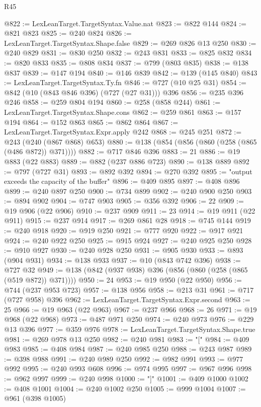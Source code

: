 \begin{lexlean}{R45}
\begin{coremodule}
@822 := LexLeanTarget.TargetSyntax.Value.nat
@823 := @822 @144
@824 := @821 @823
@825 := @240 @824
@826 := LexLeanTarget.TargetSyntax.Shape.false
@829 := @269 @826 @13 @250
@830 := @240 @829
@831 := @830 @250
@832 := @243 @831
@833 := @825 @832
@834 := @820 @833
@835 := @808 @834
@837 := @799 (@803 @835)
@838 := @138 @837
@839 := @147 @194
@840 := @146 @839
@842 := @139 (@145 @840)
@843 := LexLeanTarget.TargetSyntax.Ty.fn
@846 := @727 (@10 @25 @31)
@854 := @842 (@10 (@843 @846 @396) (@727 (@27 @31))) @396
@856 := @235 @396 @246
@858 := @259 @804 @194
@860 := @258 (@858 @244)
@861 := LexLeanTarget.TargetSyntax.Shape.cons
@862 := @259 @861
@863 := @157 @194
@864 := @152 @863
@865 := @862 @864
@867 := LexLeanTarget.TargetSyntax.Expr.apply @242
@868 := @245 @251
@872 := @243 (@240 (@867 @868) @653)
@880 := @138 (@854 (@856 (@860 (@258 (@865 (@486 @872)) @371))))
@882 := @717 @846 @396
@883 := 21
@886 := @19 @883 (@22 @883)
@889 := @882 (@237 @886 @723)
@890 := @138 @889
@892 := @797 (@727 @31)
@893 := @892 @392
@894 := @270 @392
@895 := "output exceeds the capacity of the buffer"
@896 := @409 @895
@897 := @408 @896
@899 := @240 @897 @250
@900 := @734 @899
@902 := @240 @900 @250
@903 := @894 @902
@904 := @747 @903
@905 := @356 @392
@906 := 22
@909 := @19 @906 (@22 @906)
@910 := @237 @909
@911 := 23
@914 := @19 @911 (@22 @911)
@915 := @237 @914
@917 := @269 @861 @28
@918 := @745 @144
@919 := @240 @918
@920 := @919 @250
@921 := @777 @920
@922 := @917 @921
@924 := @240 @922 @250
@925 := @915 @924
@927 := @240 @925 @250
@928 := @910 @927
@930 := @240 @928 @250
@931 := @905 @930
@933 := @893 (@904 @931)
@934 := @138 @933
@937 := @10 (@843 @742 @396)
@938 := @727 @32
@949 := @138 (@842 (@937 @938) @396 (@856 (@860 (@258 (@865 (@519 @872)) @371))))
@950 := 24
@953 := @19 @950 (@22 @950)
@956 := @744 (@237 @953 @723)
@957 := @138 @956
@958 := @213 @31
@961 := @717 (@727 @958) @396
@962 := LexLeanTarget.TargetSyntax.Expr.second
@963 := 25
@966 := @19 @963 (@22 @963)
@967 := @237 @966
@968 := 26
@971 := @19 @968 (@22 @968)
@973 := @487 @971 @250
@974 := @240 @973
@976 := @229 @13 @396
@977 := @359 @976
@978 := LexLeanTarget.TargetSyntax.Shape.true
@981 := @269 @978 @13 @250
@982 := @240 @981
@983 := "["
@984 := @409 @983
@985 := @408 @984
@987 := @240 @985 @250
@988 := @243 @987
@989 := @398 @988
@991 := @240 @989 @250
@992 := @982 @991
@993 := @977 @992
@995 := @240 @993 @608
@996 := @974 @995
@997 := @967 @996
@998 := @962 @997
@999 := @240 @998
@1000 := "]"
@1001 := @409 @1000
@1002 := @408 @1001
@1004 := @240 @1002 @250
@1005 := @999 @1004
@1007 := @961 (@398 @1005)

\end{coremodule}
\end{lexlean}
